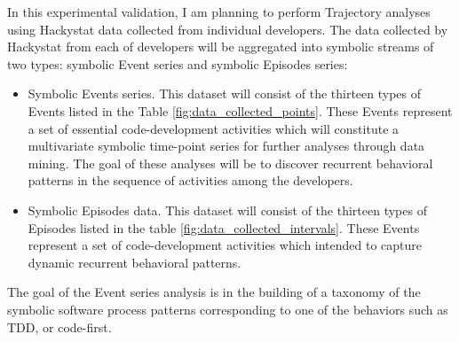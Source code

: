 In this experimental validation, I am planning to perform Trajectory analyses using Hackystat data collected from individual developers. The data collected by Hackystat from each of developers will be aggregated into symbolic streams of two types: symbolic Event series and symbolic Episodes series:
\begin{itemize}
	\item Symbolic Events series. This dataset will consist of the thirteen types of Events listed in the Table \ref{fig:data_collected_points}. These Events represent a set of essential code-development activities which will constitute a multivariate symbolic time-point series for further analyses through data mining. The goal of these analyses will be to discover recurrent behavioral patterns in the sequence of activities among the developers. 
	\item Symbolic Episodes data. This dataset will consist of the thirteen types of Episodes listed in the table \ref{fig:data_collected_intervals}. These Events represent a set of code-development activities which intended to capture dynamic recurrent behavioral patterns.
\end{itemize}

The goal of the Event series analysis is in the building of a taxonomy of the symbolic software process patterns corresponding to one of the behaviors such as TDD, or code-first.

